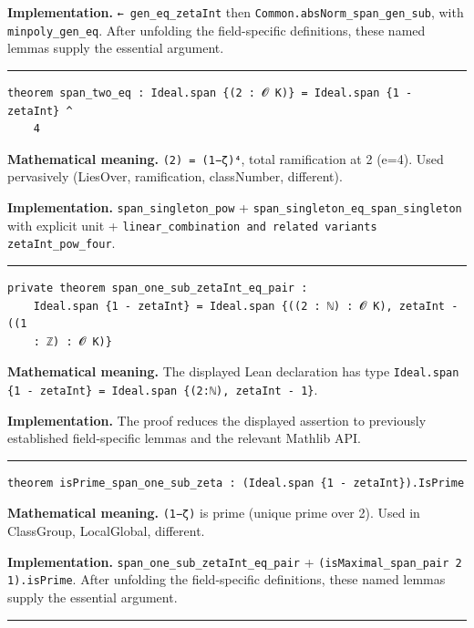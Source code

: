 \documentclass[UTF8,a4paper,11pt,fontset=fandol]{ctexart}
\theoremstyle{definition}
\newcommand{\statementsep}{\par\medskip\hrule\medskip}
\begin{document}
\noindent\textbf{Implementation.} \texttt{← gen\_\allowbreak{}eq\_\allowbreak{}zetaInt} then \texttt{Common.\allowbreak{}absNorm\_\allowbreak{}span\_\allowbreak{}gen\_\allowbreak{}sub}, with \texttt{minpoly\_\allowbreak{}gen\_\allowbreak{}eq}. After unfolding the field-specific definitions, these named lemmas supply the essential argument.\par
\statementsep
\begin{verbatim}
theorem span_two_eq : Ideal.span {(2 : 𝓞 K)} = Ideal.span {1 - zetaInt} ^
    4
\end{verbatim}
\noindent\textbf{Mathematical meaning.} \texttt{(2) = (1−ζ)⁴}, total ramification at 2 (e=4). Used pervasively (LiesOver, ramification, classNumber, different).\par
\noindent\textbf{Implementation.} \texttt{span\_\allowbreak{}singleton\_\allowbreak{}pow} + \texttt{span\_\allowbreak{}singleton\_\allowbreak{}eq\_\allowbreak{}span\_\allowbreak{}singleton} with explicit unit + \texttt{linear\_\allowbreak{}combination and related variants zetaInt\_\allowbreak{}pow\_\allowbreak{}four}.\par
\statementsep
\begin{verbatim}
private theorem span_one_sub_zetaInt_eq_pair :
    Ideal.span {1 - zetaInt} = Ideal.span {((2 : ℕ) : 𝓞 K), zetaInt - ((1
    : ℤ) : 𝓞 K)}
\end{verbatim}
\noindent\textbf{Mathematical meaning.} The displayed Lean declaration has type \texttt{Ideal.\allowbreak{}span \{1 - zetaInt\} = Ideal.\allowbreak{}span \{(2:ℕ), zetaInt - 1\}}.\par
\noindent\textbf{Implementation.} The proof reduces the displayed assertion to previously established field-specific lemmas and the relevant Mathlib API.\par
\statementsep
\begin{verbatim}
theorem isPrime_span_one_sub_zeta : (Ideal.span {1 - zetaInt}).IsPrime
\end{verbatim}
\noindent\textbf{Mathematical meaning.} \texttt{(1−ζ)} is prime (unique prime over 2). Used in ClassGroup, LocalGlobal, different.\par
\noindent\textbf{Implementation.} \texttt{span\_\allowbreak{}one\_\allowbreak{}sub\_\allowbreak{}zetaInt\_\allowbreak{}eq\_\allowbreak{}pair} + \texttt{(isMaximal\_\allowbreak{}span\_\allowbreak{}pair 2 1).\allowbreak{}isPrime}. After unfolding the field-specific definitions, these named lemmas supply the essential argument.\par
\statementsep
\end{document}
